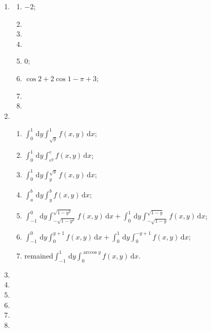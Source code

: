 \documentclass[a4paper, 11pt]{ctexart}
\begin{document}
\begin{enumerate}
    \item %
        \begin{multicols}{2}
            \begin{enumerate}[(1)]
                \item %
                    $-2$;
                \item %
                \item %
                \item %
                \item %
                    $0$;
                \item %
                    $\cos2 + 2\cos1 - \pi + 3$;
                \item %
                \item %
            \end{enumerate}
        \end{multicols}
    \item %
        \begin{enumerate}[(1)]
            \item %
                $\displaystyle{\int_0^1\,\mathrm{d}y\int_{\sqrt{y}}^1f(x,y)\,\mathrm{d}x}$;
            \item %
                $\displaystyle{\int_0^1\,\mathrm{d}y\int_{e^y}^ef(x,y)\,\mathrm{d}x}$;
            \item %
                $\displaystyle{\int_0^1\,\mathrm{d}y\int_y^{\sqrt{y}}}f(x,y)\,\mathrm{d}x$;
            \item %
                $\displaystyle{\int_a^b\,\mathrm{d}y\int_y^bf(x,y)\,\mathrm{d}x}$;
            \item %
                $\displaystyle{\int_{-1}^0\,\mathrm{d}y\int_{-\sqrt{1-y^2}}^{\sqrt{1-y^2}}f(x,y)\,\mathrm{d}x + \int_0^1\,\mathrm{d}y\int_{-\sqrt{1-y}}^{\sqrt{1-y}}f(x,y)\,\mathrm{d}x}$;
            \item %
                $\displaystyle{\int_{-1}^0\,\mathrm{d}y\int_0^{y+1}f(x,y)\,\mathrm{d}x + \int_0^1\,\mathrm{d}y\int_0^{-y+1}f(x,y)\,\mathrm{d}x}$;
            \item %
                {\color{red}remained}$\displaystyle{\int_{-1}^1\,\mathrm{d}y\int_{0}^{\arccos{y}}f(x,y)\,\mathrm{d}x}$.
        \end{enumerate}
    \item %
    \item %
    \item %
    \item %
    \item %
    \item %
\end{enumerate}
\end{document}

